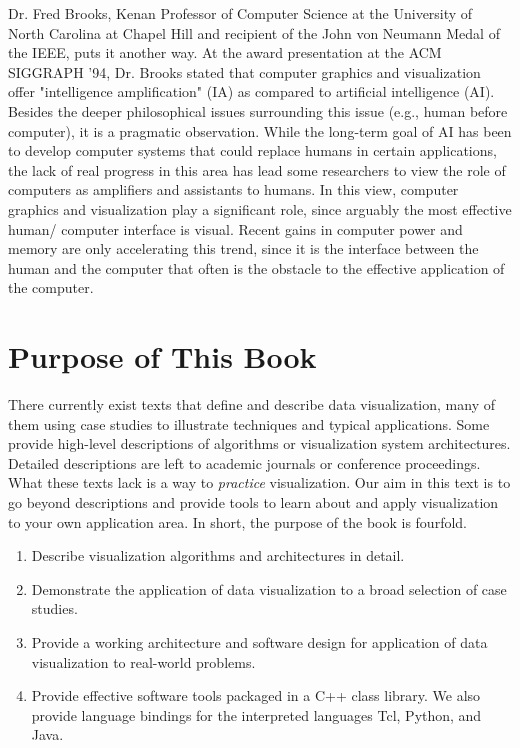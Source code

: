 Dr. Fred Brooks, Kenan Professor of Computer Science at the University of North Carolina at Chapel Hill and recipient of the John von Neumann Medal of the IEEE, puts it another way. At the award presentation at the ACM SIGGRAPH '94, Dr. Brooks stated that computer graphics and visualization offer "intelligence amplification" (IA) as compared to artificial intelligence (AI). Besides the deeper philosophical issues surrounding this issue (e.g., human before computer), it is a pragmatic observation. While the long-term goal of AI has been to develop computer systems that could replace humans in certain applications, the lack of real progress in this area has lead some researchers to view the role of computers as amplifiers and assistants to humans. In this view, computer graphics and visualization play a significant role, since arguably the most effective human/ computer interface is visual. Recent gains in computer power and memory are only accelerating this trend, since it is the interface between the human and the computer that often is the obstacle to the effective application of the computer.

\section{Purpose of This Book}

There currently exist texts that define and describe data visualization, many of them using case studies to illustrate techniques and typical applications. Some provide high-level descriptions of algorithms or visualization system architectures. Detailed descriptions are left to academic journals or conference proceedings. What these texts lack is a way to \emph{practice} visualization. Our aim in this text is to go beyond descriptions and provide tools to learn about and apply visualization to your own application area. In short, the purpose of the book is fourfold.

\begin{enumerate}
  \item Describe visualization algorithms and architectures in detail.

  \item Demonstrate the application of data visualization to a broad selection of case studies.

  \item Provide a working architecture and software design for application of data visualization to real-world problems.

  \item Provide effective software tools packaged in a C++ class library. We also provide language bindings for the interpreted languages Tcl, Python, and Java.
\end{enumerate}

